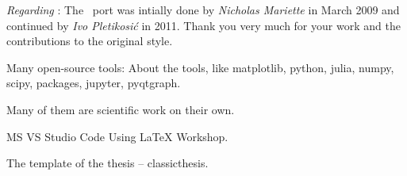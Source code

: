 \bigskip

\noindent\emph{Regarding \mLyX}: The \mLyX\ port was intially done by
\emph{Nicholas Mariette} in March 2009 and continued by
\emph{Ivo Pletikosi\'c} in 2011. Thank you very much for your work and the contributions to the original style.



Many open-source tools:
About the tools, like matplotlib, python, julia, numpy, scipy, packages, jupyter, pyqtgraph.

Many of them are scientific work on their own.

MS VS Studio Code Using LaTeX Workshop.

The template of the thesis -- classicthesis.


\endgroup